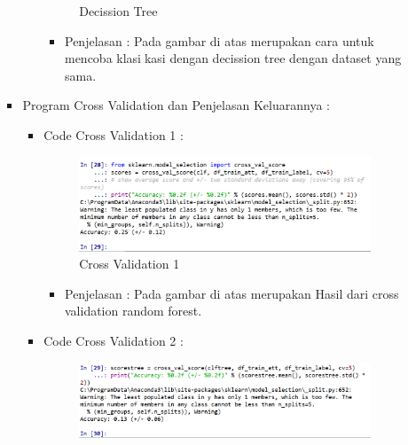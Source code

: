 \begin{enumerate}
\begin{itemize}
\begin{itemize}
\begin{itemize}
\begin{figure}[ht]
\caption{Decission Tree}
\label{contoh}
\end{figure}
\par
\begin{itemize}
\item Penjelasan : Pada gambar di atas merupakan cara untuk mencoba klasikasi dengan decission tree dengan dataset yang sama.
\par
\par
\end{itemize}
\end{itemize}



\par
\par
\item Program Cross Validation dan Penjelasan Keluarannya :
\begin{itemize}
\item Code Cross Validation 1 :
\par
\begin{figure}[ht]
\centering
\includegraphics[scale=0.7]{figures/andi/RF27.PNG}
\caption{Cross Validation 1}
\label{contoh}
\end{figure}
\par
\begin{itemize}
\item Penjelasan : Pada gambar di atas merupakan Hasil dari cross validation random forest.
\par 
\par
\end{itemize}
\item Code Cross Validation 2  :
\par
\begin{figure}[ht]
\centering
\includegraphics[scale=0.7]{figures/andi/RF28.PNG}

\end{figure}
\end{itemize}
\end{itemize}
\end{itemize}
\end{enumerate}
